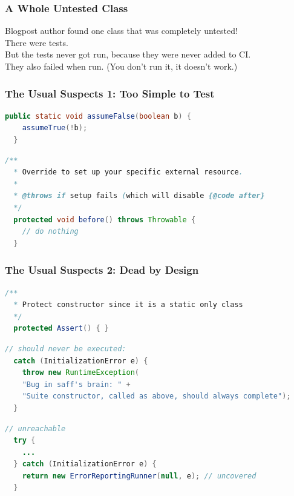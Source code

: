 \documentclass{beamer}
\newenvironment{changemargin}[1]{%
  \begin{list}{}{%
    \setlength{\topsep}{0pt}%
    \setlength{\leftmargin}{#1}%
    \setlength{\rightmargin}{1em}
    \setlength{\listparindent}{\parindent}%
    \setlength{\itemindent}{\parindent}%
    \setlength{\parsep}{\parskip}%
  }%
  \item[]}{\end{list}}
\begin{document}
\begin{frame}
  \frametitle{A Whole Untested Class}

  \begin{changemargin}{2em}
    Blogpost author found one class that was completely untested!\\[1em]

    There were tests.\\
    But the tests never got run, because they were never added to CI.\\[1em]
    They also failed when run. (You don't run it, it doesn't work.)
  \end{changemargin}
\end{frame}

\begin{frame}[fragile]
  \frametitle{The Usual Suspects 1: Too Simple to Test}

  \begin{changemargin}{2em}
\begin{lstlisting}[language=Java]
  public static void assumeFalse(boolean b) {
    assumeTrue(!b);
  }
\end{lstlisting}

\begin{lstlisting}[language=Java]
  /**
  * Override to set up your specific external resource.
  *
  * @throws if setup fails (which will disable {@code after}
  */
  protected void before() throws Throwable {
    // do nothing
  }
\end{lstlisting}
  \end{changemargin}
\end{frame}

\begin{frame}[fragile]
  \frametitle{The Usual Suspects 2: Dead by Design}
  \begin{changemargin}{2em}
\begin{lstlisting}[language=Java]
  /**
  * Protect constructor since it is a static only class
  */
  protected Assert() { }
\end{lstlisting}

\begin{lstlisting}[language=Java]
  // should never be executed:
  catch (InitializationError e) {
    throw new RuntimeException(
    "Bug in saff's brain: " +
    "Suite constructor, called as above, should always complete");
  }
\end{lstlisting}

\begin{lstlisting}[language=Java]
  // unreachable
  try {
    ...
  } catch (InitializationError e) {
    return new ErrorReportingRunner(null, e); // uncovered
  }
\end{lstlisting}
  \end{changemargin}
\end{frame}
\end{document}
